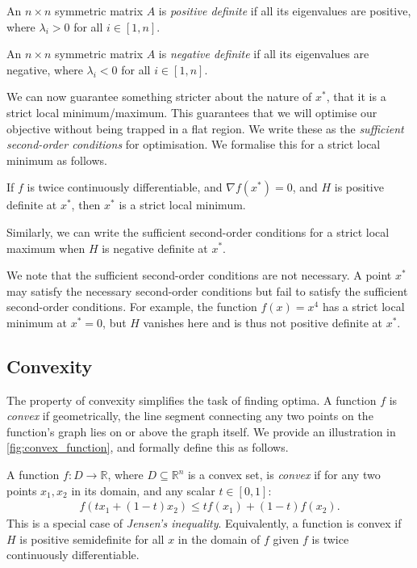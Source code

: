 \begin{definition}
    An $n \times n$ symmetric matrix $A$ is \textit{positive definite} if all its eigenvalues are positive, where $\lambda_i > 0$ for all $i \in [1, n]$.
\end{definition}
\begin{definition}
    An $n \times n$ symmetric matrix $A$ is \textit{negative definite} if all its eigenvalues are negative, where $\lambda_i < 0$ for all $i \in [1, n]$.
\end{definition}

We can now guarantee something stricter about the nature of $x^*$, that it is a strict local minimum/maximum. This guarantees that we will optimise our objective without being trapped in a flat region. We write these as the \textit{sufficient second-order conditions} for optimisation. We formalise this for a strict local minimum as follows.
\begin{definition}
    If $f$ is twice continuously differentiable, and $\nabla f(x^*) = 0$, and $H$ is positive definite at $x^*$, then $x^*$ is a strict local minimum.
    \label{definition:second_order_sufficient}
\end{definition}
Similarly, we can write the sufficient second-order conditions for a strict local maximum when $H$ is negative definite at $x^*$.

We note that the sufficient second-order conditions are not necessary. A point $x^*$ may satisfy the necessary second-order conditions but fail to satisfy the sufficient second-order conditions. For example, the function $f(x) = x^4$ has a strict local minimum at $x^* = 0$, but $H$ vanishes here and is thus not positive definite at $x^*$. 

\subsection{Convexity}
\label{ssec:convexity}

The property of convexity simplifies the task of finding optima. A function $f$ is \textit{convex} if geometrically, the line segment connecting any two points on the function's graph lies on or above the graph itself. We provide an illustration in \cref{fig:convex_function}, and formally define this as follows.

\begin{definition}
    A function $f: D \to \mathbb{R}$, where $D \subseteq \mathbb{R}^n$ is a convex set, is \textit{convex} if for any two points $x_1, x_2$ in its domain, and any scalar $t \in [0, 1]$:
    \begin{align}
        f(t x_1 + (1-t)x_2) \leq t f(x_1) + (1-t)f(x_2).
    \end{align}
    This is a special case of \textit{Jensen's inequality}. Equivalently, a function is convex if $H$ is positive semidefinite for all $x$ in the domain of $f$ given $f$ is twice continuously differentiable.
\end{definition}

